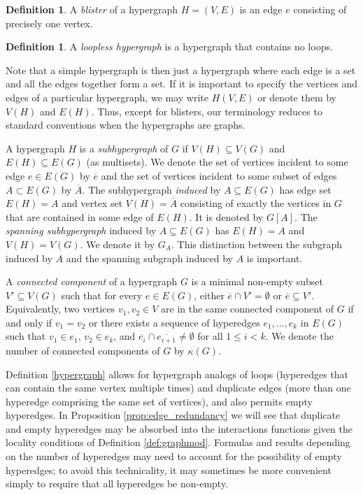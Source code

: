 \documentclass[11pt,reqno]{amsart}
\theoremstyle{plain}
\theoremstyle{definition}
\newtheorem{definition}[theorem]{Definition}
\numberwithin{equation}{section}
\begin{document}
\begin{definition}
    A \emph{blister} of a hypergraph $H = (V,E)$ is an edge $e$ consisting of precisely one vertex.
\end{definition}

\begin{definition}
    A \textit{loopless hypergraph} is a hypergraph that contains no loops.
\end{definition}

Note that a simple hypergraph is then just a hypergraph where each edge is a set and all the edges together form a set. If it is important to specify the vertices and edges of a particular hypergraph, we may write $H(V, E)$ or denote them by $V(H)$ and $E(H)$. Thus, except for blisters, our terminology reduces to standard conventions when the hypergraphs are graphs.

A hypergraph $H$ is a \emph{subhypergraph} of $G$ if $V(H) \subseteq V(G)$ and $E(H) \subseteq E(G)$ (as multisets). We denote the set of vertices incident to some edge $e \in E(G)$ by $\overline{e}$ and the set of vertices incident to some subset of edges $A \subset E(G)$ by $\overline{A}$. The subhypergraph \emph{induced} by $A \subseteq E(G)$ has edge set $E(H) = A$ and vertex set $V(H) = \overline{A}$ consisting of exactly the vertices in $G$ that are contained in some edge of $E(H)$. It is denoted by $G[A]$. The \emph{spanning subhypergraph} induced by $A \subseteq E(G)$ has $E(H) = A$ and $V(H) = V(G)$. We denote it by $G_A$. This distinction between the subgraph induced by $A$ and the spanning subgraph induced by $A$  is important.

A \emph{connected component} of a hypergraph $G$ is a minimal non-empty subset $V' \subseteq V(G)$ such that for every $e \in E(G)$, either $\overline{e} \cap V' = \emptyset$ or $\overline{e} \subseteq V'$.
Equivalently, two vertices $v_1, v_2 \in V$ are in the same connected component of $G$ if and only if $v_1 = v_2$ or there exists a sequence of hyperedges $e_1, \dots, e_k$ in $E(G)$ such that $v_1 \in e_1$, $v_2 \in e_k$, and $\overline{e_{i}} \cap \overline{e_{i+1}} \neq \emptyset$ for all $1 \leq i < k$.
We denote the number of connected components of $G$ by $\kappa(G)$. 

Definition \ref{hypergraph} allows for hypergraph analogs of loops (hyperedges that can contain the same vertex multiple times) and duplicate edges (more than one hyperedge comprising the same set of vertices), and also permits empty hyperedges.  In Proposition \ref{prop:edge_redundancy} we will see that duplicate and empty hyperedges may be absorbed into the interactions functions given the locality conditions of Definition \ref{def:graphmod}.  Formulas and results depending on the number of hyperedges may need to account for the possibility of empty hyperedges; to avoid this technicality, it may sometimes be more convenient simply to require that all hyperedges be non-empty. 
\end{document}
